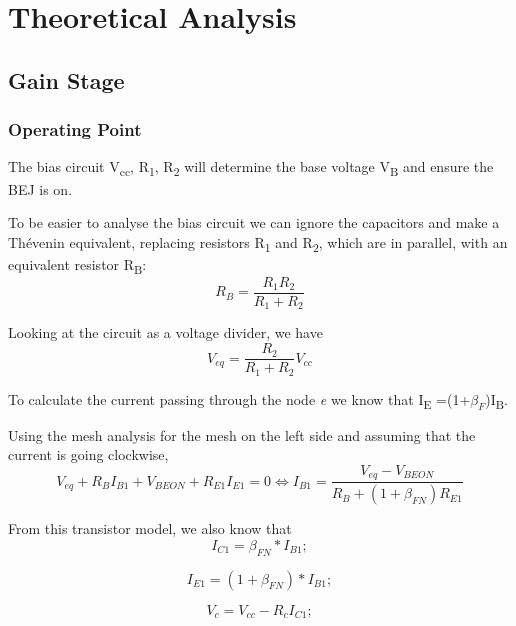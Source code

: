 \section{Theoretical Analysis} \label{sec:analysis}
 


\subsection{Gain Stage}
\subsubsection{Operating Point}
The bias circuit V\textsubscript{cc}, R\textsubscript1, R\textsubscript2 will determine the base voltage V\textsubscript B and ensure the BEJ is on.

To be easier to analyse the bias circuit we can ignore the capacitors and make a Thévenin equivalent, replacing resistors R\textsubscript{1} and R\textsubscript{2}, which are in parallel, with an equivalent resistor R\textsubscript{B}:
\begin{equation}
R_B = \frac{R_{1} R_{2}}{R_{1}+R_{2}}
\end{equation}

Looking at the circuit as a voltage divider, we have
\begin{equation}
V_{eq} = \frac{R_{2}}{R_{1}+R_{2}} V_{cc}
\end{equation}

To calculate the current passing through the node \textit{e} we know that I\textsubscript E =(1+$\beta_F$)I\textsubscript B.

Using the mesh analysis for the mesh on the left side and assuming that the current is going clockwise,
\begin{equation}
V_{eq} + R_B I_{B1} + V_{BEON} + R_{E1} I_{E1} = 0 \Leftrightarrow I_{B1} = \frac{V_{eq}-V_{BEON}}{R_B + (1+\beta_{FN}) R_{E1}}
\end{equation}

From this transistor model, we also know that
\begin{equation}
 I_{C1}=\beta_{FN}*I_{B1};
\end{equation}

\begin{equation}
 I_{E1}=(1+\beta_{FN})*I_{B1};
\end{equation}

\begin{equation}
 V_{c}=V_{cc}-R_{c}I_{C1};
\end{equation}

